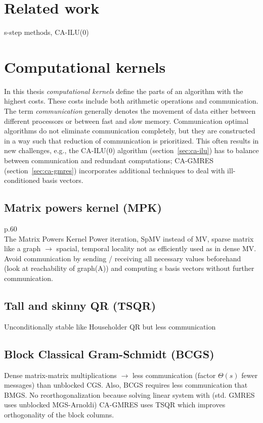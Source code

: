 \documentclass{scrartcl}
\begin{document}
\section{Related work}
s-step methods, CA-ILU(0)

\section{Computational kernels}
In this thesis \textit{computational kernels} define the parts of an algorithm with the highest costs. These costs include both arithmetic operations and communication.
The term \textit{communication} generally denotes the movement of data either between different processors or between fast and slow memory. Communication optimal algorithms do not eliminate communication completely, but they are constructed in a way such that reduction of communication is prioritized. This often results in new challenges, e.g., the  CA-ILU(0) algorithm (section~\ref{sec:ca-ilu}) has to balance between communication and redundant computations; CA-GMRES (section~\ref{sec:ca-gmres}) incorporates additional techniques to deal with ill-conditioned basis vectors.

\subsection{Matrix powers kernel (MPK)}
\cite{Hoemmen:2010:CKS:1970638} p.60\\
The Matrix Powers Kernel 
Power iteration, SpMV instead of MV, sparse matrix like a graph $\rightarrow$ spacial, temporal locality not as efficiently used as in dense MV. 
Avoid communication by sending / receiving all necessary values beforehand (look at reachability of graph(A)) and computing s basis vectors without further communication.

\subsection{Tall and skinny QR (TSQR)}
Unconditionally stable like Householder QR but less communication

\subsection{Block Classical Gram-Schmidt (BCGS)}
Dense matrix-matrix multiplications $\rightarrow$ less communication (factor $\Theta(s)$ fewer messages) than unblocked CGS. Also, BCGS requires less communication that BMGS.
No reorthogonalization because solving linear system with (std. GMRES uses unblocked MGS-Arnoldi) CA-GMRES uses TSQR which improves orthogonality of the block columns.
\end{document}
